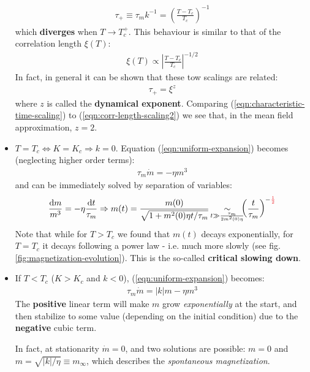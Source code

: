 \documentclass[../../main.tex]{subfiles}
\begin{document}
\begin{itemize}
\begin{align}
        \tau_+ \equiv \tau_m k^{-1} = \left(\frac{T-T_c}{T_c} \right)^{-1}
    \end{align}
    which \textbf{diverges} when $T \to T_c^+$. This behaviour is similar to that of the correlation length $\xi(T)$:
    \begin{align}\label{eqn:corr-length-scaling2}
        \xi(T) \propto \left|\frac{T-T_c}{T_c}  \right|^{-1/2}
    \end{align}
    In fact, in general it can be shown that these tow scalings are related:
    \begin{align}\label{eqn:dynamical-exponent}
        \tau_+ = \xi^z
    \end{align}
    where $z$ is called the \textbf{dynamical exponent}. Comparing (\ref{eqn:characteristic-time-scaling}) to (\ref{eqn:corr-length-scaling2}) we see that, in the mean field approximation, $z = 2$.
    \item $T = T_c \Leftrightarrow K = K_c \Rightarrow k=0$. Equation (\ref{eqn:uniform-expansion}) becomes (neglecting higher order terms): 
    \begin{align*}
        \tau_m \dot{m} = - \eta m^3
    \end{align*}
    and can be immediately solved by separation of variables:
    \begin{align*}
        \frac{\dd{m}}{m^3} = - \eta \frac{\dd{t}}{\tau_m} \Rightarrow m(t) = \frac{m(0)}{\sqrt{1 + m^2(0) \eta t/\tau_m}} \quad \>\> \underset{\mathclap{t \gg \frac{\tau_m}{2m^2(0)\eta} }}{\sim} \quad \left(\frac{t}{\tau_m} \right)^{-\textcolor{Red}{\frac{1}{2}}}
    \end{align*}
    Note that while for $T > T_c$ we found that $m(t)$ decays exponentially, for $T=T_c$ it decays following a power law - i.e. much more slowly (see fig. \ref{fig:magnetization-evolution}). This is the so-called \textbf{critical slowing down}.  
    \item If $T < T_c$ ($K > K_c$ and $k < 0$), (\ref{eqn:uniform-expansion}) becomes:
    \begin{align*}
        \tau_m \dot{m} = |k| m - \eta m^3
    \end{align*}
    The \textbf{positive} linear term will make $m$ grow \textit{exponentially} at the start, and then stabilize to some value (depending on the initial condition) due to the \textbf{negative} cubic term.
    
    In fact, at stationarity $\dot{m} = 0$, and two solutions are possible: $m=0$ and $m = \sqrt{|k|/\eta} \equiv m_\infty$, which describes the \textit{spontaneous magnetization}. 
    

\end{itemize}
\end{document}

